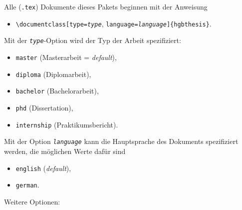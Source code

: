 Alle (\verb!.tex!) Dokumente dieses Pakets beginnen mit der Anweisung
%
\begin{itemize}
    \item[] \verb!\documentclass[!\texttt{type=\emph{type}},%
    \texttt{language=\emph{language}}\verb!]{hgbthesis}!.
\end{itemize}
%
Mit der \texttt{\emph{type}}-Option wird der Typ der Arbeit spezifiziert:
%
\begin{itemize}
	\item[] \texttt{master} (Masterarbeit = \emph{default}),
	\item[] \texttt{diploma} (Diplomarbeit),
	\item[] \texttt{bachelor} (Bachelorarbeit),
	\item[] \texttt{phd} (Dissertation),
	\item[] \texttt{internship} (Praktikumsbericht).
\end{itemize}
%
Mit der Option \texttt{\emph{language}} kann die Hauptsprache des Dokuments
spezifiziert werden, die möglichen Werte dafür sind
%
\begin{itemize}
	\item[] \texttt{english} (\emph{default}),
	\item[] \texttt{german}.
\end{itemize}
%
Weitere Optionen:
%

